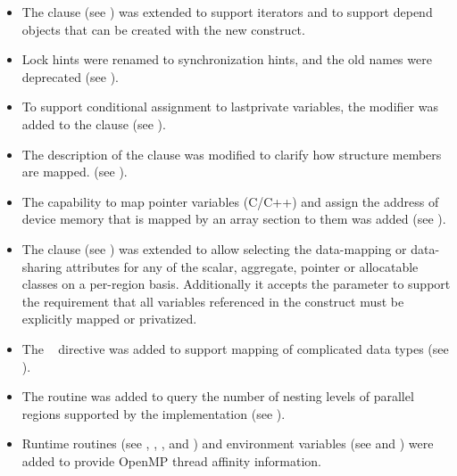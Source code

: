 \begin{itemize}
\item The  clause (see ) was
      extended to support iterators and to support depend objects that can be created with the new
       construct.

\item Lock hints were renamed to synchronization hints, and the
      old names were deprecated (see ).

\item To support conditional assignment to lastprivate variables, the
       modifier was added to the 
      clause (see ).

\item The description of the  clause was modified to clarify how
      structure members are mapped. (see ).

\item The capability to map pointer variables (C/C++) and assign the
      address of device memory that is mapped by an array section to them
      was added (see ).

\item The  clause (see )
      was extended to allow selecting the data-mapping or data-sharing attributes for
      any of the scalar, aggregate, pointer or allocatable classes on a
      per-region basis. Additionally it accepts the  parameter to support the
      requirement that all variables referenced in the
      construct must be explicitly mapped or privatized.

\item The ~ directive was added to support
      mapping of complicated data types (see
      ).

\item The  routine was added to query the
      number of nesting levels of parallel regions supported by the
      implementation (see ).

\item Runtime routines (see ,
      ,
      , and
      ) and environment variables
      (see  and
      ) were added to provide OpenMP
      thread affinity information.


\end{itemize}
